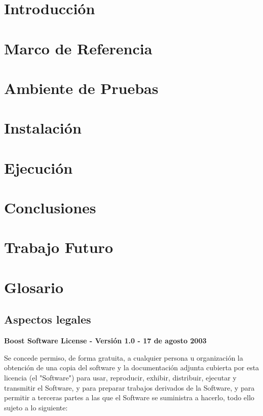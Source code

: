 \documentclass[twoside,letterpaper,12pt]{report}
\begin{document}
\newpage
{}

\chapter{Introducción}


\chapter{Marco de Referencia}\label{ChapRef}


\chapter{Ambiente de Pruebas}


\chapter{Instalación}


\chapter{Ejecución}


\chapter{Conclusiones}


\chapter{Trabajo Futuro}


\chapter{Glosario} \label{chapGlosario}


\cleardoublepage {}
\section*{Aspectos legales}


\textbf{Boost Software License\cite{BoostLicese} - Versión 1.0 - 17 de agosto 2003}

Se concede permiso, de forma gratuita, a cualquier persona u organización
la obtención de una copia del software y la documentación adjunta cubierta por
esta licencia (el "Software") para usar, reproducir, exhibir, distribuir,
ejecutar y transmitir el Software, y para preparar trabajos derivados de la
Software, y para permitir a terceras partes a las que el Software se suministra a
hacerlo, todo ello sujeto a lo siguiente:
\end{document}
